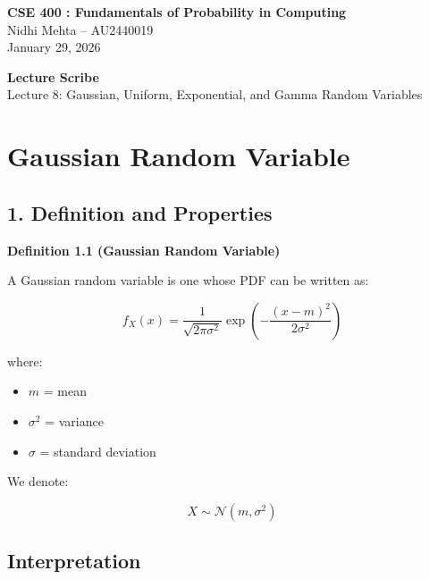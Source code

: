 \documentclass[11pt]{article}
\begin{document}

\begin{center}
{\large \textbf{CSE 400 : Fundamentals of Probability in Computing}}\\
\vspace{0.3cm}
Nidhi Mehta – AU2440019\\
January 29, 2026
\end{center}

\vspace{0.5cm}

\begin{center}
{\LARGE \textbf{Lecture Scribe}}\\[0.2cm]
{\large Lecture 8: Gaussian, Uniform, Exponential, and Gamma Random Variables}
\end{center}

\vspace{0.8cm}

\section*{Gaussian Random Variable}

\subsection*{1. Definition and Properties}

\textbf{Definition 1.1 (Gaussian Random Variable)}

A Gaussian random variable is one whose PDF can be written as:

\[
f_X(x) =
\frac{1}{\sqrt{2\pi\sigma^2}}
\exp\left(
-\frac{(x-m)^2}{2\sigma^2}
\right)
\]

where:

\begin{itemize}
    \item $m$ = mean
    \item $\sigma^2$ = variance
    \item $\sigma$ = standard deviation
\end{itemize}

We denote:

\[
X \sim \mathcal{N}(m,\sigma^2)
\]

\subsection*{Interpretation}
\end{document}
